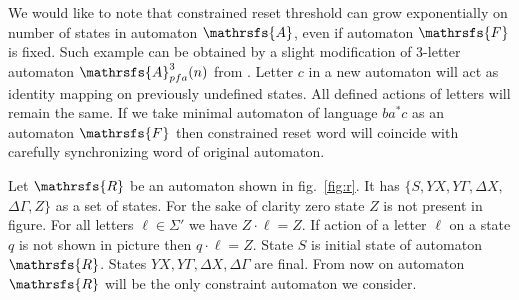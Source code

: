 \documentclass[11pt]{llncs}
\newcommand{\A}{\mathrsfs{A}}
\newcommand{\R}{\mathrsfs{R}}
\newcommand{\G}{\Gamma}
\newcommand{\D}{\Delta}
\newcommand{\rtc}{\mathrm{rt}_{c}}
\begin{document}
We would like to note that constrained reset threshold can grow exponentially on number of states in automaton $\A$, even
if automaton $\mathrsfs{F}$ is fixed. Such example can be obtained by a slight modification of 3-letter automaton $\mathrsfs{A}^3_{pfa}(n)$
from \cite{Mart}. Letter $c$ in a new automaton will act as identity mapping on previously undefined states. All defined actions
of letters will remain the same. %
If we take minimal automaton of language $ba^*c$ as an automaton $\mathrsfs{F}$ then constrained reset word will coincide 
with carefully synchronizing word of original automaton.


Let $\R$ be an automaton shown in fig.~\ref{fig:r}. It has $\{S, YX, Y\G , \D X,$ $\D \G, Z\}$ as a set of states.
For the sake of clarity zero state $Z$ is not present in figure. For all letters $\ell \in \Sigma'$ we have 
$Z \cdot \ell = Z$. If action of a letter $\ell$ on a state $q$ is not shown in picture then $q \cdot \ell = Z$.
State $S$ is initial state of automaton $\R$. States $YX, Y\G , \D X, \D \G$ are final. From now on automaton $\R$
will be the only constraint automaton we consider.
\end{document}
